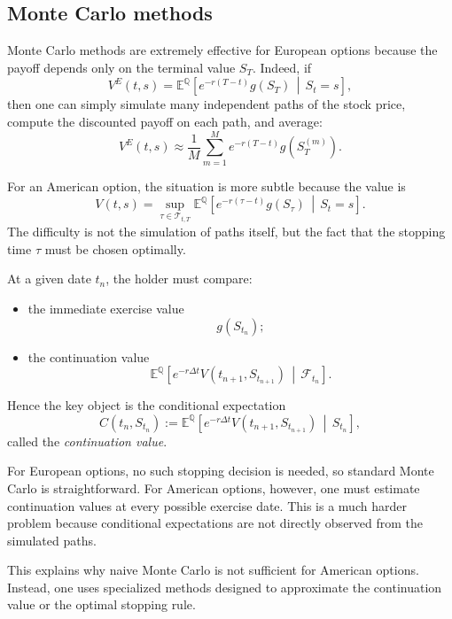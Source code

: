 \documentclass[11pt]{article}
\newcommand{\Qbb}{\mathbb{Q}}
\theoremstyle{definition}
\theoremstyle{plain}
\begin{document}
\subsection{Monte Carlo methods}

Monte Carlo methods are extremely effective for European options because
the payoff depends only on the terminal value \(S_T\).
Indeed, if
\[
V^E(t,s)
=
\mathbb E^{\Qbb}\!\left[
e^{-r(T-t)}g(S_T)\,\middle|\,S_t=s
\right],
\]
then one can simply simulate many independent paths of the stock price,
compute the discounted payoff on each path, and average:
\[
V^E(t,s)
\approx
\frac1M \sum_{m=1}^M
e^{-r(T-t)} g\!\left(S_T^{(m)}\right).
\]

For an American option, the situation is more subtle because the value is
\[
V(t,s)
=
\sup_{\tau\in\mathcal T_{t,T}}
\mathbb E^{\Qbb}\!\left[
e^{-r(\tau-t)}g(S_\tau)\,\middle|\,S_t=s
\right].
\]
The difficulty is not the simulation of paths itself, but the fact that
the stopping time \(\tau\) must be chosen optimally.

\medskip

At a given date \(t_n\), the holder must compare:
\begin{itemize}[leftmargin=1.4em]
\item the immediate exercise value
\[
g(S_{t_n});
\]
\item the continuation value
\[
\mathbb E^{\Qbb}\!\left[
e^{-r\Delta t}V(t_{n+1},S_{t_{n+1}})
\,\middle|\, \mathcal F_{t_n}
\right].
\]
\end{itemize}

Hence the key object is the conditional expectation
\[
C(t_n,S_{t_n})
:=
\mathbb E^{\Qbb}\!\left[
e^{-r\Delta t}V(t_{n+1},S_{t_{n+1}})
\,\middle|\, S_{t_n}
\right],
\]
called the \emph{continuation value}.

For European options, no such stopping decision is needed, so standard
Monte Carlo is straightforward.
For American options, however, one must estimate continuation values at
every possible exercise date.
This is a much harder problem because conditional expectations are not
directly observed from the simulated paths.

\medskip

This explains why naive Monte Carlo is not sufficient for American
options.
Instead, one uses specialized methods designed to approximate the
continuation value or the optimal stopping rule.
\end{document}
